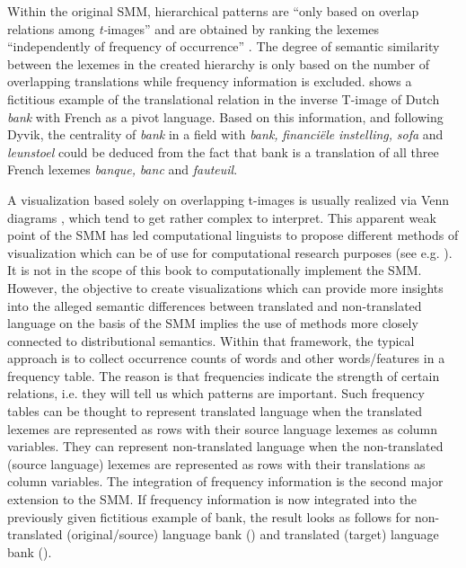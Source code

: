 Within the original SMM, hierarchical patterns are “only based on overlap relations among \textit{t-}images” and are obtained by ranking the lexemes “independently of frequency of occurrence” \citep[73]{johansson_translational_1998}. The degree of semantic similarity between the lexemes in the created hierarchy is only based on the number of overlapping translations while frequency information is excluded.  shows a fictitious example of the translational relation in the inverse T-image of Dutch \textit{bank} with French as a pivot language. Based on this information, and following Dyvik, the centrality of \textit{bank} in a field with \textit{bank,} \textit{financiële} \textit{instelling,} \textit{sofa} and \textit{leunstoel} could be deduced from the fact that bank is a translation of all three French lexemes \textit{banque,} \textit{banc} and \textit{fauteuil}.

A visualization based solely on overlapping t-images is usually realized via Venn diagrams \citep{dyvik_semantic_2011}, which tend to get rather complex to interpret. This apparent weak point of the SMM has led computational linguists to propose different methods of visualization which can be of use for computational research purposes (see e.g. \citealt{ganter_conceptual_2005}). It is not in the scope of this book to computationally implement the SMM. However, the objective to create visualizations which can provide more insights into the alleged semantic differences between translated and non-translated language on the basis of the SMM implies the use of methods more closely connected to distributional semantics. Within that framework, the typical approach is to collect occurrence counts of words and other words/features in a frequency table. The reason is that frequencies indicate the strength of certain relations, i.e. they will tell us which patterns are important. Such frequency tables can be thought to represent translated language when the translated lexemes are represented as rows with their source language lexemes as column variables. They can represent non-translated language when the non-translated (source language) lexemes are represented as rows with their translations as column variables. The integration of frequency information is the second major extension to the SMM. If frequency information is now integrated into the previously given fictitious example of bank, the result looks as follows for non-translated (original/source) language bank () and translated (target) language bank ().

